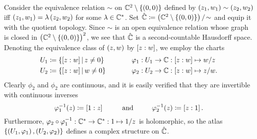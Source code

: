 \begin{example}
    Consider the equivalence relation $\sim$ on $\mathbb{C}^2\setminus\left\{\left(0,0\right)\right\}$ defined by $\left(z_1,w_1\right)\sim\left(z_2,w_2\right)$ iff $\left(z_1,w_1\right)=\lambda\left(z_2,w_2\right)$ for some $\lambda\in\mathbb{C}^\ast$. Set $\hat{\mathbb{C}}\coloneqq\left(\mathbb{C}^2\setminus\left\{\left(0,0\right)\right\}\right)/\!\sim$ and equip it with the quotient topology. Since $\sim$ is an open equivalence relation whose graph is closed in $\left(\mathbb{C}^2\setminus\left\{\left(0,0\right)\right\}\right)^2$, we see that $\hat{\mathbb{C}}$ is a second-countable Hausdorff space. Denoting the equivalence class of $\left(z,w\right)$ by $\left[z:w\right]$, we employ the charts
    \begin{equation*}
        \begin{alignedat}{2}
            U_1&\coloneqq\l\{\proje{z:w}\mid z\neq0\r\}\ \ \ \ \ \ \ \ \ \ \ \ &&\phi_1:U_1\to\C:\proje{z:w}\mapsto w/z \\
            U_2&\coloneqq\l\{\proje{z:w}\mid w\neq0\r\}&&\phi_2:U_2\to\C:\proje{z:w}\mapsto z/w.
        \end{alignedat}
    \end{equation*}
    Clearly $\phi_2$ and $\phi_2$ are continuous, and it is easily verified that they are invertible with continuous inverses
    \begin{equation*}
        \phi_1^{-1}\!\l(z\r)\coloneqq\proje{1:z}\ \ \ \ \ \ \ \ \textrm{and}\ \ \ \ \ \ \ \ \phi_2^{-1}\!\l(z\r)\coloneqq\proje{z:1}.
    \end{equation*}
    Furthermore, $\varphi_2\circ\varphi_1^{-1}:\mathbb{C}^\ast\to\mathbb{C}^\ast:1\mapsto1/z$ is holomorphic, so the atlas $\left\{\left(U_1,\varphi_1\right),\left(U_2,\varphi_2\right)\right\}$ defines a complex structure on $\hat{\mathbb{C}}$.\exqed
\end{example}

